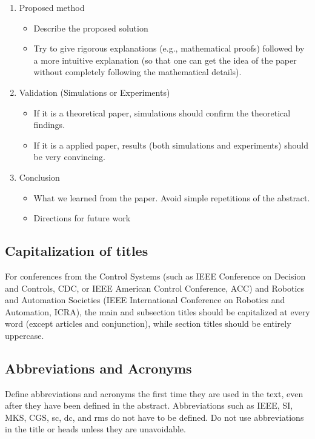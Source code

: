 \documentclass[letterpaper, 10 pt, conference]{ieeeconf}
\begin{document}
\begin{enumerate}
\begin{itemize}
  \end{itemize}
\item Proposed method
  \begin{itemize}
  \item Describe the proposed solution
  \item Try to give rigorous explanations (e.g., mathematical proofs) followed by a more intuitive explanation (so that one can get the idea of the paper without completely following the mathematical details).
  \end{itemize}
\item Validation (Simulations or Experiments)
  \begin{itemize}
  \item If it is a theoretical paper, simulations should confirm the theoretical findings.
  \item If it is a applied paper, results (both simulations and experiments) should be very convincing.
  \end{itemize}
\item Conclusion
  \begin{itemize}
  \item What we learned from the paper. Avoid simple repetitions of the abstract.
  \item Directions for future work
  \end{itemize}
\end{enumerate}

\subsection{Capitalization of titles}
For conferences from the Control Systems (such as IEEE Conference on Decision and Controls, CDC, or IEEE American Control Conference, ACC) and Robotics and Automation Societies (IEEE International Conference on Robotics and Automation, ICRA), the main and subsection titles should be capitalized at every word (except articles and conjunction), while section titles should be entirely uppercase.

\subsection{Abbreviations and Acronyms}\label{sec:abbreviations}
Define abbreviations and acronyms the first time they are used in the text, even after they have been defined in the abstract. Abbreviations such as IEEE, SI, MKS, CGS, sc, dc, and rms do not have to be defined. Do not use abbreviations in the title or heads unless they are unavoidable.
\end{document}
